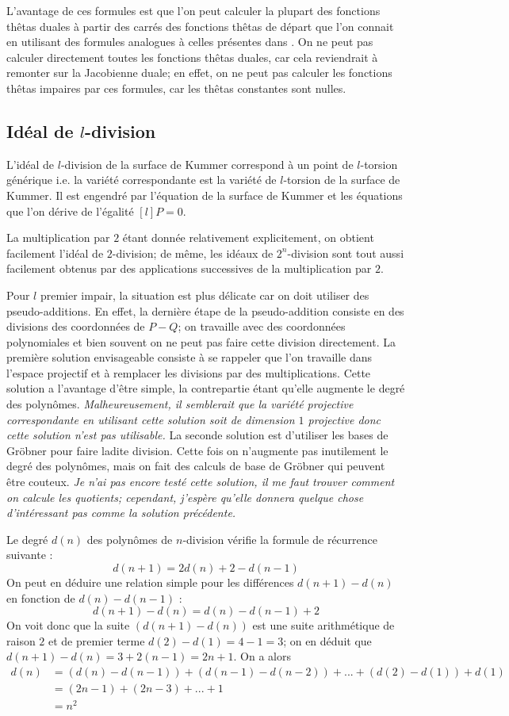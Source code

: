 \documentclass[a4paper]{article}
\theoremstyle{definition}
\theoremstyle{remark}
\numberwithin{equation}{section}
\begin{document}
L'avantage de ces formules est que l'on peut calculer la plupart des fonctions thêtas duales à partir des carrés des fonctions thêtas de départ que l'on connait en utilisant des formules analogues à celles présentes dans \citep{gaudry}. On ne peut pas calculer directement toutes les fonctions thêtas duales, car cela reviendrait à remonter sur la Jacobienne duale; en effet, on ne peut pas calculer les fonctions thêtas impaires par ces formules, car les thêtas constantes sont nulles.

\subsection{Idéal de $l$-division}
L'idéal de $l$-division de la surface de Kummer correspond à un point de $l$-torsion générique i.e. la variété correspondante est la variété de $l$-torsion de la surface de Kummer. Il est engendré par l'équation de la surface de Kummer et les équations que l'on dérive de l'égalité $[l]P=0$.

La multiplication par $2$ étant donnée relativement explicitement, on obtient facilement l'idéal de $2$-division; de même, les idéaux de $2^n$-division sont tout aussi facilement obtenus par des applications successives de la multiplication par $2$.

Pour $l$ premier impair, la situation est plus délicate car on doit utiliser des pseudo-additions. En effet, la dernière étape de la pseudo-addition consiste en des divisions des coordonnées de $P-Q$; on travaille avec des coordonnées polynomiales et bien souvent on ne peut pas faire cette division directement. La première solution envisageable consiste à se rappeler que l'on travaille dans l'espace projectif et à remplacer les divisions par des multiplications. Cette solution a l'avantage d'être simple, la contrepartie étant qu'elle augmente le degré des polynômes. \emph{Malheureusement, il semblerait que la variété projective correspondante en utilisant cette solution soit de dimension $1$ projective donc cette solution n'est pas utilisable.}
La seconde solution est d'utiliser les bases de Gröbner pour faire ladite division. Cette fois on n'augmente pas inutilement le degré des polynômes, mais on fait des calculs de base de Gröbner qui peuvent être couteux. \emph{Je n'ai pas encore testé cette solution, il me faut trouver comment on calcule les quotients; cependant, j'espère qu'elle donnera quelque chose d'intéressant pas comme la solution précédente.}

Le degré $d(n)$ des polynômes de $n$-division vérifie la formule de récurrence suivante :
$$d(n+1) = 2d(n) + 2 - d(n-1)$$
On peut en déduire une relation simple pour les différences $d(n+1)-d(n)$ en fonction de $d(n)-d(n-1)$ :
$$d(n+1)-d(n) = d(n) - d(n-1) + 2$$
On voit donc que la suite $(d(n+1)-d(n))$ est une suite arithmétique de raison $2$ et de premier terme $d(2)-d(1) = 4 - 1 = 3$; on en déduit que $d(n+1)-d(n) = 3 + 2(n-1) = 2n + 1$.
On a alors
\begin{align*}
d(n) &= (d(n) - d(n-1)) + (d(n-1) - d(n-2)) + ... + (d(2)-d(1)) + d(1) \\
 &= (2n-1) + (2n - 3) + ... + 1 \\
 &= n^2
\end{align*}
\end{document}
